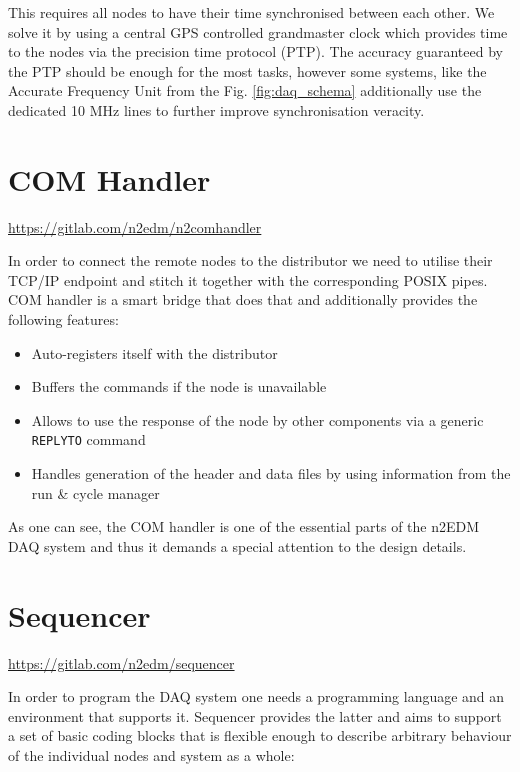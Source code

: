 This requires all nodes to have their time synchronised between each other. We solve it by using a central GPS controlled grandmaster clock which provides time to the nodes via the precision time protocol (PTP). The accuracy guaranteed by the PTP should be enough for the most tasks, however some systems, like the Accurate Frequency Unit from the Fig. \ref{fig:daq_schema} additionally use the dedicated 10 MHz lines to further improve synchronisation veracity.

\section{COM Handler}
\label{sec:com_handler}

\url{https://gitlab.com/n2edm/n2comhandler}

In order to connect the remote nodes to the distributor we need to utilise their TCP/IP endpoint and stitch it together with the corresponding POSIX pipes. COM handler is a smart bridge that does that and additionally provides the following features:

\begin{itemize}
	\item Auto-registers itself with the distributor
	\item Buffers the commands if the node is unavailable
	\item Allows to use the response of the node by other components via a generic \texttt{REPLYTO} command
	\item Handles generation of the header and data files by using information from the run \& cycle manager
\end{itemize}

As one can see, the COM handler is one of the essential parts of the n2EDM DAQ system and thus it demands a special attention to the design details.

\section{Sequencer}
\label{sec:sequencer}

\url{https://gitlab.com/n2edm/sequencer}

In order to program the DAQ system one needs a programming language and an environment that supports it. Sequencer provides the latter and aims to support a set of basic coding blocks that is flexible enough to describe arbitrary behaviour of the individual nodes and system as a whole:

